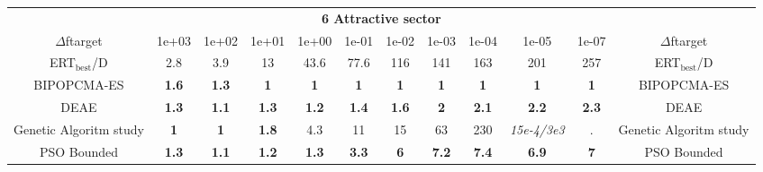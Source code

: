 \begin{tabular}{cccccccccccc}
 & \multicolumn{10}{c}{{\normalsize \textbf{6 Attractive sector}}}\\
$\Delta$ftarget& 1e+03& 1e+02& 1e+01& 1e+00& 1e-01& 1e-02& 1e-03& 1e-04& 1e-05& 1e-07 & $\Delta$ftarget \\
ERT$_{\textrm{best}}$/D& 2.8& 3.9& 13& 43.6& 77.6& 116& 141& 163& 201& 257 & ERT$_{\textrm{best}}$/D \\
\hline
BIPOPCMA-ES & \textbf{1.6} & \textbf{1.3} & \textbf{1} & \textbf{1} & \textbf{1} & \textbf{1} & \textbf{1} & \textbf{1} & \textbf{1} & \textbf{1} & BIPOPCMA-ES \cite{add_an_entry_for_BIPOPCMA-ES_in_bbob.bib}\\
DEAE & \textbf{1.3} & \textbf{1.1} & \textbf{1.3} & \textbf{1.2} & \textbf{1.4} & \textbf{1.6} & \textbf{2} & \textbf{2.1} & \textbf{2.2} & \textbf{2.3} & DEAE \cite{add_an_entry_for_DEAE_in_bbob.bib}\\
Genetic Algoritm study & \textbf{1} & \textbf{1} & \textbf{1.8} & 4.3 & 11 & 15 & 63 & 230 & \textit{15e-4}\textit{/3e3} & . & Genetic Algoritm study \cite{add_an_entry_for_Genetic Algoritm study_in_bbob.bib}\\
PSO Bounded & \textbf{1.3} & \textbf{1.1} & \textbf{1.2} & \textbf{1.3} & \textbf{3.3} & \textbf{6} & \textbf{7.2} & \textbf{7.4} & \textbf{6.9} & \textbf{7} & PSO Bounded \cite{add_an_entry_for_PSO Bounded_in_bbob.bib}
\end{tabular}

